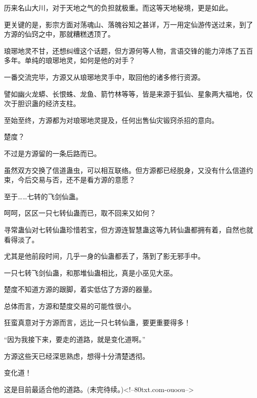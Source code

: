 \begin{this_body}
历来名山大川，对于天地之气的负担就极重。而这等天地秘境，更是如此。

更关键的是，影宗方面对荡魂山、落魄谷知之甚详，万一用定仙游传送过来，到了方源的仙窍之中，那就糟糕透顶了。

琅琊地灵不甘，还想纠缠这个话题，但方源何等人物，言语交锋的能力淬炼了五百多年。单纯的琅琊地灵，如何是他的对手？

一番交流完毕，方源又从琅琊地灵手中，取回他的诸多修行资源。

譬如幽火龙蟒、长恨蛛、龙鱼、箭竹林等等，皆是来源于狐仙、星象两大福地，仅次于胆识蛊的经济支柱。

至始至终，方源都为对琅琊地灵提及，任何出售仙灾锻窍杀招的意向。

楚度？

不过是方源留的一条后路而已。

虽然双方交换了信道蛊虫，可以相互联络。但方源都已经脱身，又没有什么信道约束，今后交易与否，还不是看方源的意愿？

至于……七转的飞剑仙蛊。

呵呵，区区一只七转仙蛊而已，取不回来又如何？

寻常蛊仙对七转仙蛊珍惜若宝，但方源连智慧蛊这等九转仙蛊都拥有着，自然也就看得淡了。

尤其是他前段时间，几乎一身的仙蛊都丢了，落到了影无邪手中。

一只七转飞剑仙蛊，和那堆仙蛊相比，真是小巫见大巫。

楚度不知道方源的跟脚，着实低估了方源的器量。

总体而言，方源和楚度交易的可能性很小。

狂蛮真意对于方源而言，远比一只七转仙蛊，要更重要得多！

“因为我接下来，要走的道路，就是变化道啊。”

方源这些天已经深思熟虑，想得十分清楚透彻。

变化道！

这是目前最适合他的道路。(未完待续。)<!--80txt.com-ouoou-->

\end{this_body}

